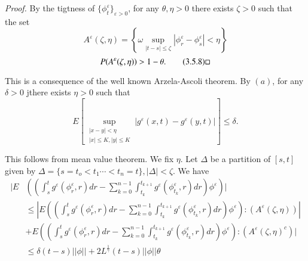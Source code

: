 \noindent \textit{Proof.}
  By the tigtness of $\{ \phi^{\varepsilon}_t \}_{\varepsilon > 0}$,
  for any $\theta, \eta > 0$ there exists $\zeta >0$ such that the set  
\begin{equation*}
    A^{\varepsilon}(\zeta, \eta) = \left\{ \omega \sup_{|t-s| \leq \zeta}
    |\phi^{\varepsilon}_r-\phi^{\varepsilon}_s| < \eta \right\}
    \tag{3.5.7}\label{c3:eq3.5.7}
    \end{equation*}
\begin{equation*}
P(A^{\varepsilon}(\zeta, \eta))> 1 - \theta. 
\tag{3.5.8}\label{c3:eq3.5.8}\hfill\Box
\end{equation*}

This is a consequence of the well known Arzela-Ascoli theorem. By
$(a)$, for any $\delta > 0$ jthere exists $\eta >0$ such that  
\begin{equation*}
  E\left[ \sup_{\substack{|x-y|< \eta \\ |x|\leq K,| y | \leq K}}
    |g^{\varepsilon}(x,t)-g^{\varepsilon}(y,t)|\right] \leq
  \delta. \tag{3.5.9}\label{c3:eq3.5.9} 
\end{equation*}


This follows from mean value theorem. We fix $\eta$. Let $\Delta$ be
a partition of $[s,t]$ given by $\Delta = \{ s = t_o < t_1 \cdots <
t_n = t \}, |\Delta| < \zeta$. We have  
\begin{align*}
   |E & \left(\left(\int^t_s g^\varepsilon (\phi^\varepsilon_r,  r)dr
   - \sum^{n-1}_{k=0} 
  \int^{t_{k+1}}_{t_k} g^\varepsilon (\phi^\varepsilon_{t_k},  r)dr\right)
  \phi^\varepsilon \right)| \\ 
  & \le | E \left( \left(\int^t_s g^\varepsilon (\phi^\varepsilon_r,  r)dr -
  \sum^{n-1}_{k=0} \int^{t_{k+1}}_{t_k} g^\varepsilon
  (\phi^\varepsilon_{t_k},  r)dr\right) \phi^\varepsilon \right):  (A^\varepsilon
  (\zeta,  \eta))| \\ 
  & +  E\left(\left(\int^t_s g^\varepsilon (\phi^\varepsilon_r,  r)dr -
  \sum^{n-1}_{k=0} \int^{t_{k+1}}_{t_k} g^\varepsilon
  (\phi^\varepsilon_{t_k},  r)dr\right) \phi^\varepsilon \right):  (A^\varepsilon
  (\zeta,  \eta)^c)| \\  
  & \le \delta(t - s) || \phi || + 2L^{\frac{1}{\gamma}}(t-s) || \phi
  || \theta \tag{3.5.10}\label{c3:eq3.5.10} 
\end{align*}\pageoriginale

